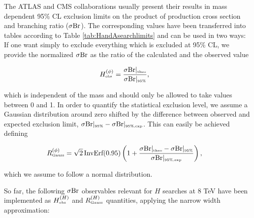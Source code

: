 \documentclass[aps,superscriptaddress,nofootinbib,floatfix,notitlepage]{revtex4-1}
\begin{document}
The ATLAS and CMS collaborations usually present their results in mass dependent 95\% CL exclusion limits on the product of production cross section and branching ratio ($\sigma {\rm Br}$). The corresponding values have been transferred into tables according to Table \ref{tab:HandAsearchlimits} and can be used in two ways:
If one want simply to exclude everything which is excluded at 95\% CL, we provide the normalized $\sigma {\rm Br}$ as the ratio of the calculated and the observed value

\begin{align}
 H^{(\phi )}_\text{\tiny obs} &= \frac{\sigma {\rm Br}|_{\text{\tiny{theo}}} }{\sigma {\rm Br}|_{\text{\tiny{95\%}}}} , \nonumber
\end{align}

which is independent of the mass and should only be allowed to take values between 0 and 1.
In order to quantify the statistical exclusion level, we assume a Gaussian distribution around zero shifted by the difference between observed and expected exclusion limit, $\sigma {\rm Br}|_{\text{\tiny{95\%}}}-\sigma {\rm Br}|_{\text{\tiny{95\%,exp}}}$. This can easily be achieved defining

\begin{align}
 R^{(\phi )}_\text{\tiny Gauss} &= \sqrt{2} \, \text{InvErf}(0.95) \left( 1 + \frac{\sigma {\rm Br}|_{\text{\tiny{theo}}} - \sigma {\rm Br}|_{\text{\tiny{95\%}}} }{\sigma {\rm Br}|_{\text{\tiny{95\%,exp}}}} \right) , \nonumber
\end{align}

which we assume to follow a normal distribution.

So far, the following $\sigma {\rm Br}$ observables relevant for $H$ searches at 8 TeV have been implemented as $H^{(H)}_\text{\tiny obs}$ and $R^{(H)}_\text{\tiny Gauss}$ quantities, applying the narrow width approximation:
\end{document}
